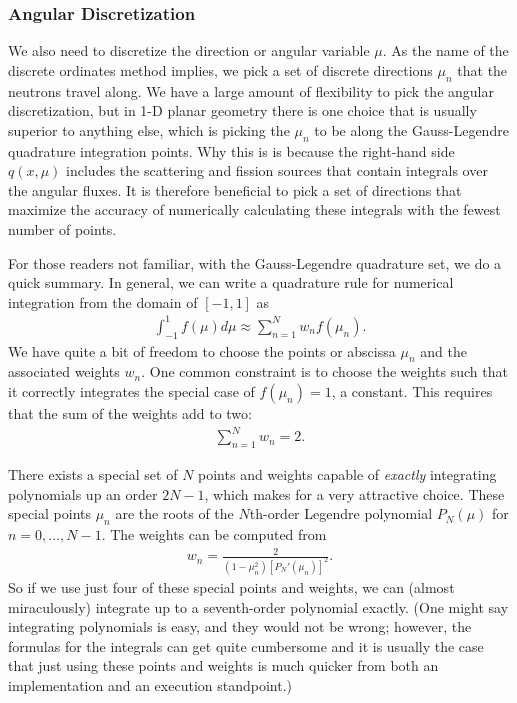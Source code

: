\subsubsection{Angular Discretization}

We also need to discretize the direction or angular variable $\mu$. As the name of the discrete ordinates method implies, we pick a set of discrete directions $\mu_n$ that the neutrons travel along. We have a large amount of flexibility to pick the angular discretization, but in 1-D planar geometry there is one choice that is usually superior to anything else, which is picking the $\mu_n$ to be along the Gauss-Legendre quadrature integration points. Why this is is because the right-hand side $q(x,\mu)$ includes the scattering and fission sources that contain integrals over the angular fluxes. It is therefore beneficial to pick a set of directions that maximize the accuracy of numerically calculating these integrals with the fewest number of points.

For those readers not familiar, with the Gauss-Legendre quadrature set, we do a quick summary. In general, we can write a quadrature rule for numerical integration from the domain of $[-1,1]$ as
\begin{align}
  \int_{-1}^1 f(\mu) d\mu \approx \sum_{n=1}^N w_n f(\mu_n) .
\end{align}
We have quite a bit of freedom to choose the points or abscissa $\mu_n$ and the associated weights $w_n$. One common constraint is to choose the weights such that it correctly integrates the special case of $f(\mu_n) = 1$, a constant. This requires that the sum of the weights add to two:
\begin{align}
  \sum_{n=1}^N w_n = 2.
\end{align}

There exists a special set of $N$ points and weights capable of \emph{exactly} integrating polynomials up an order $2N - 1$, which makes for a very attractive choice. These special points $\mu_n$ are the roots of the $N$th-order Legendre polynomial $P_N(\mu)$ for $n = 0,\ldots,N-1$. The weights can be computed from
\begin{align}
  w_n = \frac{ 2 }{ ( 1 - \mu_n^2 ) \left[ P_N'(\mu_n) \right]^2 } .
\end{align}
So if we use just four of these special points and weights, we can (almost miraculously) integrate up to a seventh-order polynomial exactly. (One might say integrating polynomials is easy, and they would not be wrong; however, the formulas for the integrals can get quite cumbersome and it is usually the case that just using these points and weights is much quicker from both an implementation and an execution standpoint.) 

